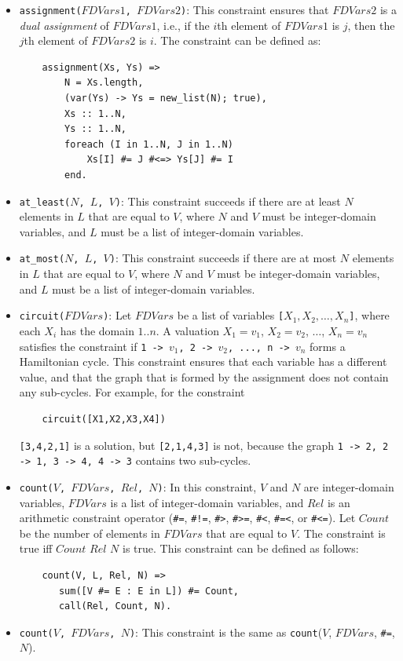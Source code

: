 \begin{itemize}
\item \texttt{assignment($FDVars1$, $FDVars2$)}: This constraint ensures that $FDVars2$ is a \emph{dual assignment} of $FDVars1$, i.e., if the $i$th element of $FDVars1$ is $j$, then the $j$th element of $FDVars2$ is $i$. The constraint can be defined as:
\begin{verbatim}
    assignment(Xs, Ys) =>
        N = Xs.length,
        (var(Ys) -> Ys = new_list(N); true),
        Xs :: 1..N,
        Ys :: 1..N,
        foreach (I in 1..N, J in 1..N)
            Xs[I] #= J #<=> Ys[J] #= I
        end.
\end{verbatim}

\item \texttt{at\_least($N$, $L$, $V$)}: This constraint succeeds if there are at least $N$ elements in $L$ that are equal to $V$, where $N$ and $V$ must be integer-domain variables, and $L$ must be a list of integer-domain variables.

\item \texttt{at\_most($N$, $L$, $V$)}: This constraint succeeds if there are at most $N$ elements in $L$ that are equal to $V$, where $N$ and $V$ must be integer-domain variables, and $L$ must be a list of integer-domain variables.

\item \texttt{circuit($FDVars$)}: Let $FDVars$ be a list of variables \texttt{[$X_1,X_2,\ldots,X_n$]}, where each \texttt{$X_i$} has the domain $1..n$. A valuation $X_1 = v_1$, $X_2 = v_2$, $\ldots$, $X_n = v_n$ satisfies the constraint if \texttt{1 -> $v_1$, 2 -> $v_2$, ..., n -> $v_n$} forms a Hamiltonian cycle. This constraint ensures that each variable has a different value, and that the graph that is formed by the assignment does not contain any sub-cycles. For example, for the constraint 
\begin{verbatim}
    circuit([X1,X2,X3,X4])
\end{verbatim}
\texttt{[3,4,2,1]} is a solution, but \texttt{[2,1,4,3]} is not, because the graph \texttt{1 -> 2, 2 -> 1, 3 -> 4, 4 -> 3} contains two sub-cycles.
\item \texttt{count($V$, $FDVars$, $Rel$, $N$)}:  In this constraint, $V$ and $N$ are integer-domain variables, $FDVars$ is a list of integer-domain variables, and $Rel$ is an arithmetic constraint operator (\verb+#=+,  \verb+#!=+,  \verb+#>+,  \verb+#>=+,  \verb+#<+,  \verb+#=<+, or \verb+#<=+). Let $Count$ be the number of elements in $FDVars$ that are equal to $V$. The constraint is true iff $Count$ $Rel$ $N$ is true. This constraint can be defined as follows:
\begin{verbatim}
    count(V, L, Rel, N) =>
       sum([V #= E : E in L]) #= Count,
       call(Rel, Count, N).
\end{verbatim}
\item \texttt{count($V$, $FDVars$, $N$)}: This constraint is the same as \texttt{count}($V$, $FDVars$, \verb+#=+, $N$).


\end{itemize}
